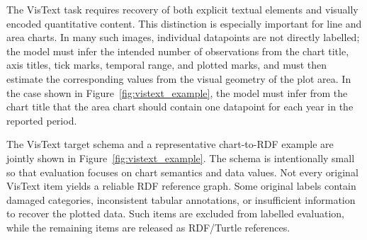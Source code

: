 \documentclass[preprint,12pt]{elsarticle}
\begin{document}
The VisText task requires recovery of both explicit textual elements and visually encoded quantitative content. This distinction is especially important for line and area charts. In many such images, individual datapoints are not directly labelled; the model must infer the intended number of observations from the chart title, axis titles, tick marks, temporal range, and plotted marks, and must then estimate the corresponding values from the visual geometry of the plot area. In the case shown in Figure~\ref{fig:vistext_example}, the model must infer from the chart title that the area chart should contain one datapoint for each year in the reported period.

The VisText target schema and a representative chart-to-RDF example are jointly shown in Figure~\ref{fig:vistext_example}. The schema is intentionally small so that evaluation focuses on chart semantics and data values. Not every original VisText item yields a reliable RDF reference graph. Some original labels contain damaged categories, inconsistent tabular annotations, or insufficient information to recover the plotted data. Such items are excluded from labelled evaluation, while the remaining items are released as RDF/Turtle references.
\end{document}
